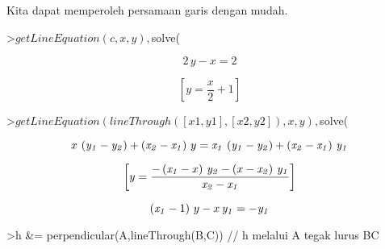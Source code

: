 \documentclass[a4paper,10pt]{article}
\begin{document}
\begin{eulernotebook}
\begin{eulercomment}
\begin{eulercomment}
\begin{eulercomment}
\begin{eulercomment}
\begin{eulercomment}
\begin{eulercomment}
\begin{eulercomment}
\begin{eulercomment}
\begin{eulercomment}
\begin{eulercomment}
\begin{eulercomment}
\begin{eulercomment}
\begin{eulercomment}
\begin{eulercomment}
\begin{eulercomment}
\begin{eulercomment}
\begin{eulercomment}
\begin{eulercomment}
\begin{eulercomment}
\begin{eulercomment}
\begin{eulercomment}
\begin{eulercomment}
\begin{eulercomment}
\begin{eulercomment}
\begin{eulercomment}
\begin{eulercomment}
\begin{eulercomment}
\begin{eulercomment}
\begin{eulercomment}
\begin{eulercomment}
\begin{euleroutput}
\end{euleroutput}
\begin{eulercomment}
Kita dapat memperoleh persamaan garis dengan mudah.
\end{eulercomment}
\begin{eulerprompt}
>$getLineEquation(c,x,y), $solve(%
\end{eulerprompt}
\begin{eulerformula}
\[
2\,y-x=2
\]
\end{eulerformula}
\begin{eulerformula}
\[
\left[ y=\frac{x}{2}+1 \right] 
\]
\end{eulerformula}
\begin{eulerprompt}
>$getLineEquation(lineThrough([x1,y1],[x2,y2]),x,y), $solve(%
\end{eulerprompt}
\begin{eulerformula}
\[
x\,\left({\it y_1}-{\it y_2}\right)+\left({\it x_2}-{\it x_1}
 \right)\,y={\it x_1}\,\left({\it y_1}-{\it y_2}\right)+\left(
 {\it x_2}-{\it x_1}\right)\,{\it y_1}
\]
\end{eulerformula}
\begin{eulerformula}
\[
\left[ y=\frac{-\left({\it x_1}-x\right)\,{\it y_2}-\left(x-
 {\it x_2}\right)\,{\it y_1}}{{\it x_2}-{\it x_1}} \right] 
\]
\end{eulerformula}
\begin{eulerformula}
\[
\left({\it x_1}-1\right)\,y-x\,{\it y_1}=-{\it y_1}
\]
\end{eulerformula}
\begin{eulerprompt}
>h &= perpendicular(A,lineThrough(B,C)) // h melalui A tegak lurus BC
\end{eulerprompt}

\end{eulercomment}
\end{eulercomment}
\end{eulercomment}
\end{eulercomment}
\end{eulercomment}
\end{eulercomment}
\end{eulercomment}
\end{eulercomment}
\end{eulercomment}
\end{eulercomment}
\end{eulercomment}
\end{eulercomment}
\end{eulercomment}
\end{eulercomment}
\end{eulercomment}
\end{eulercomment}
\end{eulercomment}
\end{eulercomment}
\end{eulercomment}
\end{eulercomment}
\end{eulercomment}
\end{eulercomment}
\end{eulercomment}
\end{eulercomment}
\end{eulercomment}
\end{eulercomment}
\end{eulercomment}
\end{eulercomment}
\end{eulercomment}
\end{eulercomment}
\end{eulernotebook}
\end{document}
